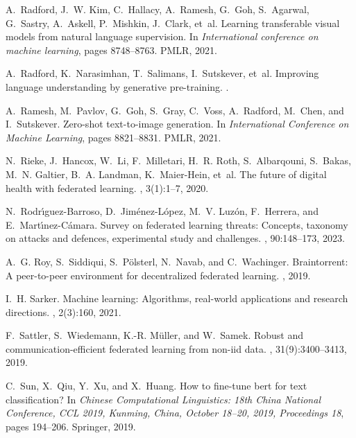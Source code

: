 \documentclass[11pt]{article}
\begin{document}
\begin{thebibliography}{10}
A.~Radford, J.~W. Kim, C.~Hallacy, A.~Ramesh, G.~Goh, S.~Agarwal, G.~Sastry,
  A.~Askell, P.~Mishkin, J.~Clark, et~al.
\newblock Learning transferable visual models from natural language
  supervision.
\newblock In {\em International conference on machine learning}, pages
  8748--8763. PMLR, 2021.

A.~Radford, K.~Narasimhan, T.~Salimans, I.~Sutskever, et~al.
\newblock Improving language understanding by generative pre-training.
.

A.~Ramesh, M.~Pavlov, G.~Goh, S.~Gray, C.~Voss, A.~Radford, M.~Chen, and
  I.~Sutskever.
\newblock Zero-shot text-to-image generation.
\newblock In {\em International Conference on Machine Learning}, pages
  8821--8831. PMLR, 2021.

N.~Rieke, J.~Hancox, W.~Li, F.~Milletari, H.~R. Roth, S.~Albarqouni, S.~Bakas,
  M.~N. Galtier, B.~A. Landman, K.~Maier-Hein, et~al.
\newblock The future of digital health with federated learning.
, 3(1):1--7, 2020.

N.~Rodr{\'\i}guez-Barroso, D.~Jim{\'e}nez-L{\'o}pez, M.~V. Luz{\'o}n,
  F.~Herrera, and E.~Mart{\'\i}nez-C{\'a}mara.
\newblock Survey on federated learning threats: Concepts, taxonomy on attacks
  and defences, experimental study and challenges.
, 90:148--173, 2023.

A.~G. Roy, S.~Siddiqui, S.~P{\"o}lsterl, N.~Navab, and C.~Wachinger.
\newblock Braintorrent: A peer-to-peer environment for decentralized federated
  learning.
, 2019.

I.~H. Sarker.
\newblock Machine learning: Algorithms, real-world applications and research
  directions.
, 2(3):160, 2021.

F.~Sattler, S.~Wiedemann, K.-R. M{\"u}ller, and W.~Samek.
\newblock Robust and communication-efficient federated learning from non-iid
  data.
,
  31(9):3400--3413, 2019.

C.~Sun, X.~Qiu, Y.~Xu, and X.~Huang.
\newblock How to fine-tune bert for text classification?
\newblock In {\em Chinese Computational Linguistics: 18th China National
  Conference, CCL 2019, Kunming, China, October 18--20, 2019, Proceedings 18},
  pages 194--206. Springer, 2019.


\end{thebibliography}
\end{document}
